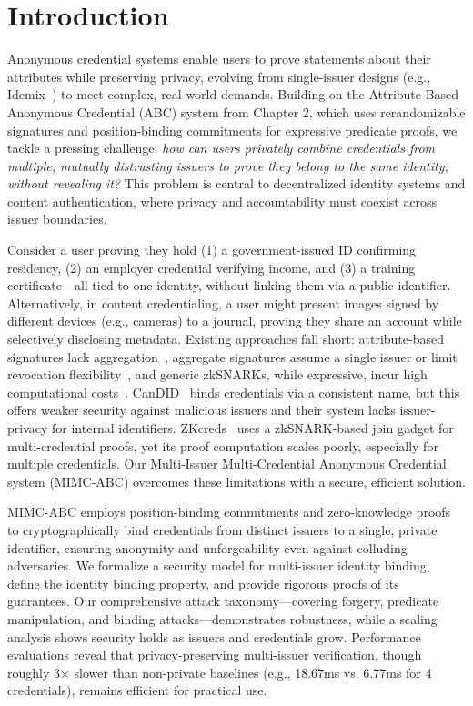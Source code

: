 \label{sec:mimc}

\section{Introduction}
Anonymous credential systems enable users to prove statements about their attributes while preserving privacy, evolving from single-issuer designs (e.g., Idemix~\cite{camenisch_design_2002}) to meet complex, real-world demands. Building on the Attribute-Based Anonymous Credential (ABC) system from Chapter 2, which uses rerandomizable signatures and position-binding commitments for expressive predicate proofs, we tackle a pressing challenge: \emph{how can users privately combine credentials from multiple, mutually distrusting issuers to prove they belong to the same identity, without revealing it?} This problem is central to decentralized identity systems and content authentication, where privacy and accountability must coexist across issuer boundaries.

Consider a user proving they hold (1) a government-issued ID confirming residency, (2) an employer credential verifying income, and (3) a training certificate—all tied to one identity, without linking them via a public identifier. Alternatively, in content credentialing, a user might present images signed by different devices (e.g., cameras) to a journal, proving they share an account while selectively disclosing metadata. Existing approaches fall short: attribute-based signatures lack aggregation~\cite{cimato_signature_2003}, aggregate signatures assume a single issuer or limit revocation flexibility~\cite{boneh_aggregate_2003}, and generic zkSNARKs, while expressive, incur high computational costs~\cite{rosenberg_zk-creds_2022}. CanDID~\cite{maram2021candid} binds credentials via a consistent name, but this offers weaker security against malicious issuers and their system lacks issuer-privacy for internal identifiers. ZKcreds~\cite{rosenberg_zk-creds_2022} uses a zkSNARK-based join gadget for multi-credential proofs, yet its proof computation scales poorly, especially for multiple credentials. Our Multi-Issuer Multi-Credential Anonymous Credential system (MIMC-ABC) overcomes these limitations with a secure, efficient solution.

MIMC-ABC employs position-binding commitments and zero-knowledge proofs to cryptographically bind credentials from distinct issuers to a single, private identifier, ensuring anonymity and unforgeability even against colluding adversaries. We formalize a security model for multi-issuer identity binding, define the identity binding property, and provide rigorous proofs of its guarantees. Our comprehensive attack taxonomy—covering forgery, predicate manipulation, and binding attacks—demonstrates robustness, while a scaling analysis shows security holds as issuers and credentials grow. Performance evaluations reveal that privacy-preserving multi-issuer verification, though roughly 3× slower than non-private baselines (e.g., 18.67ms vs. 6.77ms for 4 credentials), remains efficient for practical use.

